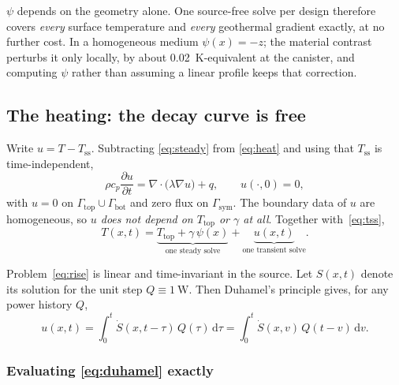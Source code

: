 \documentclass[11pt,a4paper]{article}
\theoremstyle{plain}
\newcommand{\Tss}{T_{\mathrm{ss}}}
\newcommand{\Ttop}{T_{\mathrm{top}}}
\newcommand{\dd}{\,\mathrm{d}}
\begin{document}
$\psi$ depends on the geometry alone. One source-free solve per design
therefore covers \emph{every} surface temperature and \emph{every} geothermal
gradient exactly, at no further cost. In a homogeneous medium $\psi(x) = -z$;
the material contrast perturbs it only locally, by about
\SI{0.02}{\kelvin}-equivalent at the canister, and computing $\psi$ rather than
assuming a linear profile keeps that correction.

\subsection{The heating: the decay curve is free}

Write $u = T - \Tss$. Subtracting \eqref{eq:steady} from \eqref{eq:heat} and
using that $\Tss$ is time-independent,
\begin{equation}
  \rho c_p \frac{\partial u}{\partial t}
    = \nabla\cdot\bigl(\lambda \nabla u\bigr) + q,
  \qquad
  u(\cdot, 0) = 0,
  \label{eq:rise}
\end{equation}
with $u = 0$ on $\Gamma_{\mathrm{top}} \cup \Gamma_{\mathrm{bot}}$ and zero flux
on $\Gamma_{\mathrm{sym}}$. The boundary data of $u$ are homogeneous, so
\emph{$u$ does not depend on $\Ttop$ or $\gamma$ at all}. Together
with~\eqref{eq:tss},
\begin{equation}
  T(x,t) = \underbrace{\Ttop + \gamma\,\psi(x)}_{\text{one steady solve}}
         + \underbrace{u(x,t)}_{\text{one transient solve}} .
  \label{eq:split}
\end{equation}

Problem~\eqref{eq:rise} is linear and time-invariant in the source. Let
$S(x,t)$ denote its solution for the unit step $Q \equiv \SI{1}{\watt}$. Then
Duhamel's principle gives, for any power history $Q$,
\begin{equation}
  u(x,t) = \int_0^t \dot S(x, t - \tau)\, Q(\tau) \dd\tau
         = \int_0^t \dot S(x, v)\, Q(t - v) \dd v .
  \label{eq:duhamel}
\end{equation}

\subsubsection*{Evaluating \eqref{eq:duhamel} exactly}
\end{document}
